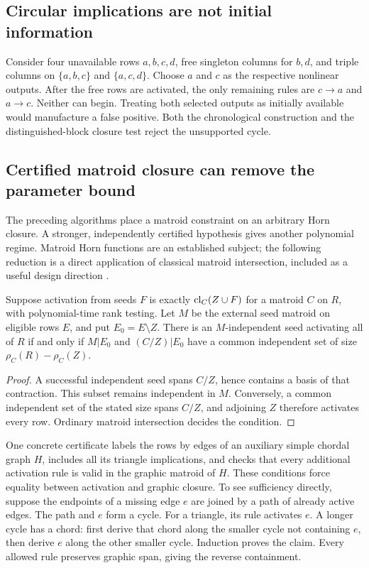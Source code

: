 \subsection{Circular implications are not initial information}

Consider four unavailable rows $a,b,c,d$, free singleton columns for
$b,d$, and triple columns on $\{a,b,c\}$ and $\{a,c,d\}$. Choose
$a$ and $c$ as the respective nonlinear outputs. After the free rows are
activated, the only remaining rules are $c\to a$ and $a\to c$.
Neither can begin. Treating both selected outputs as initially available
would manufacture a false positive. Both the chronological construction
and the distinguished-block closure test reject the unsupported cycle.

\subsection{Certified matroid closure can remove the parameter bound}

The preceding algorithms place a matroid constraint on an arbitrary Horn
closure. A stronger, independently certified hypothesis gives another
polynomial regime. Matroid Horn functions are an established subject;
the following reduction is a direct application of classical matroid
intersection, included as a useful design direction \cite{matroid-horn,edmonds}.

\begin{proposition}
\label{prop:matroid-activation}
Suppose activation from seeds $F$ is exactly $\operatorname{cl}_C(Z\cup F)$ for a
matroid $C$ on $R$, with polynomial-time rank testing. Let $M$ be the
external seed matroid on eligible rows $E$, and put $E_0=E\setminus Z$.
There is an $M$-independent seed activating all of $R$ if and only if
$M|E_0$ and $(C/Z)|E_0$ have a
common independent set of size $\rho_C(R)-\rho_C(Z)$.
\end{proposition}
\begin{proof}
A successful independent seed spans $C/Z$, hence contains a basis of that
contraction. This subset remains independent in $M$. Conversely, a common
independent set of the stated size spans $C/Z$, and adjoining $Z$ therefore
activates every row. Ordinary matroid intersection decides the condition.
\end{proof}

One concrete certificate labels the rows by edges of an auxiliary simple
chordal graph $H$, includes all its triangle implications, and checks that
every additional activation rule is valid in the graphic matroid of $H$.
These conditions force equality between activation and graphic closure.
To see sufficiency directly, suppose the endpoints of a missing edge $e$
are joined by a path of already active edges. The path and $e$ form a
cycle. For a triangle, its rule activates $e$. A longer cycle has a chord:
first derive that chord along the smaller cycle not containing $e$, then
derive $e$ along the other smaller cycle. Induction proves the claim.
Every allowed rule preserves graphic span, giving the reverse containment.

